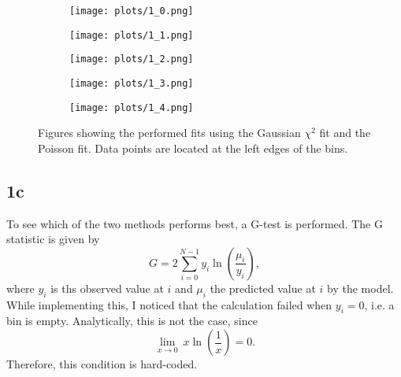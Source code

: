 \newpage

\begin{figure}[h!]
    \centering
    \begin{subfigure}[b]{0.4\textwidth}
        \centering
        \texttt{[image: plots/1\_0.png]}
        \caption{}
        \label{fig:1_0}
    \end{subfigure}
    \begin{subfigure}[b]{0.4\textwidth}
        \centering
        \texttt{[image: plots/1\_1.png]}
        \caption{}
        \label{fig:1_1}
    \end{subfigure}
    \begin{subfigure}[b]{0.4\textwidth}
        \centering
        \texttt{[image: plots/1\_2.png]}
        \caption{}
        \label{fig:1_2}
    \end{subfigure}
    \begin{subfigure}[b]{0.4\textwidth}
        \centering
        \texttt{[image: plots/1\_3.png]}
        \caption{}
        \label{fig:1_3}
    \end{subfigure}
    \begin{subfigure}[b]{0.4\textwidth}
        \centering
        \texttt{[image: plots/1\_4.png]}
        \caption{}
        \label{fig:1_4}
    \end{subfigure}
       \caption{Figures showing the performed fits using the Gaussian $\chi^2$ fit and the Poisson fit. Data points are located at the left edges of the bins.}
       \label{fig:1}
\end{figure}

\subsection*{1c}
To see which of the two methods performs best, a G-test is performed. The G statistic is given by
\begin{equation}
    G=2 \sum_{i=0}^{N-1} y_i\ln\left(\frac{\mu_i}{y_i}\right),
\end{equation}
where $y_i$ is ths observed value at $i$ and $\mu_i$ the predicted value at $i$ by the model. While implementing this, I noticed that the calculation failed when $y_i=0$, i.e. a bin is empty. Analytically, this is not the case, since
\begin{equation}
    \lim_{x \to 0} \  x\ln\left(\frac{1}{x}\right) = 0.
\end{equation}
Therefore, this condition is hard-coded.

